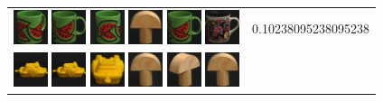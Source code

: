 \begin{figure}[tbp]
\begin{center}
\begin{tabular}{m{11cm} | m{3cm} |}
\includegraphics[width=1cm]{coil/beeld-33.eps}
\includegraphics[width=1cm]{coil/beeld-30.eps}
\includegraphics[width=1cm]{coil/beeld-32.eps}
\includegraphics[width=1cm]{coil/beeld-1.eps}
\includegraphics[width=1cm]{coil/beeld-30.eps}
\includegraphics[width=1cm]{coil/beeld-60.eps}
& {\scriptsize 0.10238095238095238}
\\
\includegraphics[width=1cm]{coil/beeld-12.eps}
\includegraphics[width=1cm]{coil/beeld-12.eps}
\includegraphics[width=1cm]{coil/beeld-14.eps}
\includegraphics[width=1cm]{coil/beeld-0.eps}
\includegraphics[width=1cm]{coil/beeld-3.eps}
\includegraphics[width=1cm]{coil/beeld-0.eps}

\end{tabular}
\end{center}
\end{figure}
